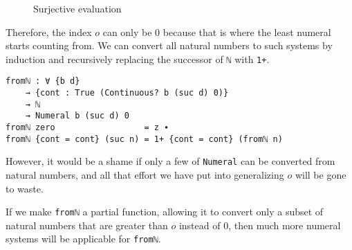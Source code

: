 \documentclass[\main/thesis.tex]{subfiles}
\begin{document}
\begin{figure}[H]
    \centering
    \begin{adjustbox}{max width=\textwidth}
    \end{adjustbox}
\caption{Surjective evaluation}
\label{figure:33}
\end{figure}


Therefore, the index $o$ can only be $0$ because that is where the least
numeral starts counting from. We can convert all natural numbers to such systems
by induction and recursively replacing the successor of \lstinline|ℕ| with
\lstinline|1+|.

\begin{lstlisting}
fromℕ : ∀ {b d}
    → {cont : True (Continuous? b (suc d) 0)}
    → ℕ
    → Numeral b (suc d) 0
fromℕ zero                  = z ∙
fromℕ {cont = cont} (suc n) = 1+ {cont = cont} (fromℕ n)
\end{lstlisting}

However, it would be a shame if only a few of \lstinline|Numeral| can be
converted from natural numbers, and all that effort we have put into
generalizing $ o $ will be gone to waste.

If we make \lstinline|fromℕ| a partial function, allowing it to convert only
a subset of natural numbers that are greater than $ o $ instead of $ 0 $,
then much more numeral systems will be applicable for \lstinline|fromℕ|.
\end{document}
